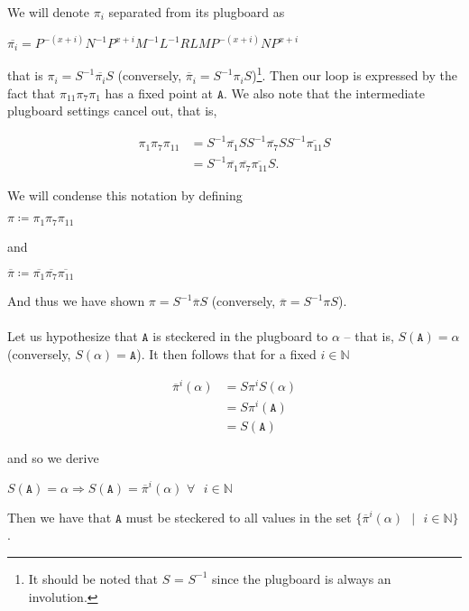 We will denote $\pi_i$ separated from its plugboard as
\begin{center}
  $\overline{\pi_i} =
  P^{-(x+i)}N^{-1}P^{x+i}M^{-1}L^{-1}RLMP^{-(x+i)}NP^{x+i}$
\end{center}
\noindent that is $\pi_i = S^{-1}\overline{\pi_i}S$
(conversely, $\overline\pi_i = S^{-1}\pi_iS$)\footnote{It
  should be noted that $S$ = $S^{-1}$ since the plugboard is always an
involution.}.
Then our loop is expressed by the fact that
$\pi_{11}\pi_7\pi_1$ has a fixed point at $\texttt{A}$.
We also note that the intermediate plugboard settings cancel out, that is,
\begin{center}
  \begin{align*}
    \pi_{1}\pi_7\pi_{11} & =
    S^{-1}\overline{\pi_{1}}SS^{-1}\overline{\pi_7}SS^{-1}\overline{\pi_{11}}S
    \\&= S^{-1}
    \overline{\pi_{1}}\overline{\pi_7}\overline{\pi_{11}}
    S.
  \end{align*}
\end{center}
We will condense this notation by defining
\begin{center}
  $\pi \coloneq \pi_{1}\pi_7\pi_{11}$
\end{center}
and
\begin{center}
  $\overline{\pi} \coloneq
  \overline{\pi_{1}}\overline{\pi_7}\overline{\pi_{11}}$
\end{center}
And thus we have shown $\pi = S^{-1}\overline{\pi}S$ (conversely,
$\overline\pi = S^{-1}\pi S$).
\\\\Let us hypothesize that $\texttt{A}$ is steckered in the plugboard to
$\alpha$ -- that is, $S(\texttt{A}) = \alpha$ (conversely, $S(\alpha)
= \texttt{A}$).
It then follows that for a fixed $i\in\mathbb{N}$
\begin{center}
  \begin{align*}
    \overline{\pi}^i(\alpha) & = S\pi^i S(\alpha)
    \\&= S \pi^i(\texttt{A})
    \\&= S(\texttt{A})
  \end{align*}
\end{center}
and so we derive
\begin{center}
  $S(\texttt{A}) = \alpha \Rightarrow S(\texttt{A}) =
  \overline{\pi}^i(\alpha)\text{
  }\forall\text{ }i\in\mathbb{N}$
\end{center}
Then we have that $\texttt{A}$ must be steckered to all values in the set
$\{\overline{\pi}^i(\alpha)\text{ }\vert\text{ }i\in\mathbb{N}\}$.
